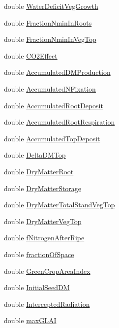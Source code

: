 \begin{DoxyCompactItemize}
\item 
double \hyperlink{classcrop_a5eb2d5b9554ecd6e8f7f32b229509b67}{WaterDeficitVegGrowth}
\item 
double \hyperlink{classcrop_a86b3309065f886170bff7ad71c0a853f}{FractionNminInRoots}
\item 
double \hyperlink{classcrop_a3ac764feb8fb805863a89f3fbda9f831}{FractionNminInVegTop}
\item 
double \hyperlink{classcrop_a40992582378c797a8b5a4b8d9aef6d2b}{CO2Effect}
\item 
double \hyperlink{classcrop_ac9e8384797116e758558faff120ae56d}{AccumulatedDMProduction}
\item 
double \hyperlink{classcrop_ad4c7a7759997919efa9c9befb53cab69}{AccumulatedNFixation}
\item 
double \hyperlink{classcrop_a29dcfc8e28d3f6689a94184c968a1882}{AccumulatedRootDeposit}
\item 
double \hyperlink{classcrop_a9342a07dc579e1e3169eba7060741339}{AccumulatedRootRespiration}
\item 
double \hyperlink{classcrop_a9bf4f47a0a193df878aa15b364dbec14}{AccumulatedTopDeposit}
\item 
double \hyperlink{classcrop_a0491b172b4874adcd1b3930cb3be00fe}{DeltaDMTop}
\item 
double \hyperlink{classcrop_a3c5f4942cf46d45168caf4da80b79537}{DryMatterRoot}
\item 
double \hyperlink{classcrop_a4a2803c0618d2f662abfa8d230c811df}{DryMatterStorage}
\item 
double \hyperlink{classcrop_ae5c58459f879a52a543bc517918513fd}{DryMatterTotalStandVegTop}
\item 
double \hyperlink{classcrop_a755b12e801a538bb34a8c7b829047e76}{DryMatterVegTop}
\item 
double \hyperlink{classcrop_ac8a4c50c9066688c48f1d8fc6df8561c}{fNitrogenAfterRipe}
\item 
double \hyperlink{classcrop_a394d3da7bbc4c297a68b5c6f575c5ecc}{fractionOfSpace}
\item 
double \hyperlink{classcrop_a2691a60a48a5166469df5da0e0e824fb}{GreenCropAreaIndex}
\item 
double \hyperlink{classcrop_a86aa841b9bfef88701e24c3a1922bba5}{InitialSeedDM}
\item 
double \hyperlink{classcrop_af42802c05fc1e8dcba94d04bcb41f163}{InterceptedRadiation}
\item 
double \hyperlink{classcrop_a7cc6a117013deeda470335c166066615}{maxGLAI}
\item 

\end{DoxyCompactItemize}
